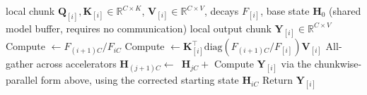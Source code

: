 \caption{Mamba-2 context-parallel forward. Accelerator $i = 0, ..., N_\textrm{CP} - 1$ owns chunk $i$ (tokens $[iC, (i+1)C)$) and executes the same procedure; the coloured quantities are the only ones exchanged across accelerators.}
\begin{algorithmic}
\REQUIRE local chunk $\mathbf{Q}_{[i]}, \mathbf{K}_{[i]} \in \mathbb{R}^{C \times K}$, $\mathbf{V}_{[i]} \in \mathbb{R}^{C \times V}$, decays $F_{[i]}$, base state $\mathbf{H}_0$ (shared model buffer, requires no communication)
\ENSURE local output chunk $\mathbf{Y}_{[i]} \in \mathbb{R}^{C \times V}$
\STATE Compute  $\leftarrow F_{(i+1)C} / F_{iC}$
\STATE Compute  $\leftarrow \mathbf{K}_{[i]}^\top \mathrm{diag}\left(F_{(i+1)C}/F_{[i]}\right) \mathbf{V}_{[i]}$
\STATE All-gather  across accelerators
\STATE $\mathbf{H}_{(j+1)C} \leftarrow$ $\, \mathbf{H}_{jC} +$ 
\ENDFOR
\STATE Compute $\mathbf{Y}_{[i]}$ via the chunkwise-parallel form above, using the corrected starting state $\mathbf{H}_{iC}$
\STATE Return $\mathbf{Y}_{[i]}$
\end{algorithmic}
